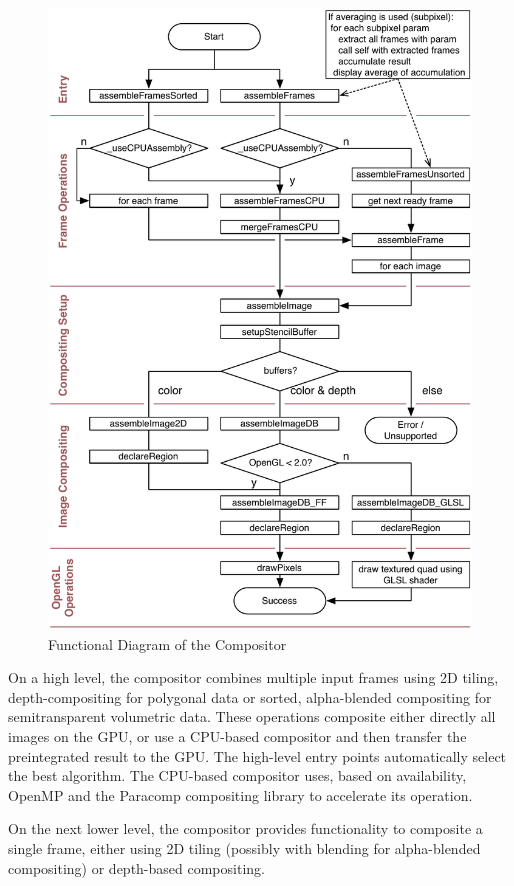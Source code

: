 \documentclass[10pt,a4]{scrartcl}
\begin{document}
\begin{figure}[h!t]\center
  \includegraphics[width=.9\textwidth]{images/compositor.pdf}
  {\caption{\label{fCompositor}Functional Diagram of the Compositor}}
\end{figure}
On a high level, the compositor combines multiple input frames using 2D
tiling, depth-compositing for polygonal data or sorted, alpha-blended
compositing for semitransparent volumetric data. These operations
composite either directly all images on the GPU, or use a CPU-based
compositor and then transfer the preintegrated result to the GPU. The
high-level entry points automatically select the best algorithm. The
CPU-based compositor uses, based on availability, OpenMP and the
Paracomp compositing library to accelerate its operation.

On the next lower level, the compositor provides functionality to
composite a single frame, either using 2D tiling (possibly with blending
for alpha-blended compositing) or depth-based compositing. 
\end{document}

